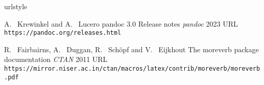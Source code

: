 \begin{thebibliography}{2}
    \providecommand{\natexlab}[1]{#1}
    \providecommand{\url}[1]{\texttt{#1}}
    \expandafter\ifx\csname urlstyle\endcsname\relax
      \providecommand{\doi}[1]{doi: #1}\else
      \providecommand{\doi}{doi: \begingroup \urlstyle{rm}\Url}\fi

A.~ Krewinkel and A.~ Lucero
\newblock pandoc 3.0 Release notes
\newblock \emph{pandoc}  2023
\newblock URL \url{https://pandoc.org/releases.html}

R.~ Fairbairns, A.~ Duggan, R.~ Schöpf and V.~ Eijkhout
\newblock The moreverb package documentation
\newblock \emph{CTAN}  2011
\newblock URL \url{https://mirror.niser.ac.in/ctan/macros/latex/contrib/moreverb/moreverb.pdf}

\end{thebibliography}


\address{%
Abhishek Ulayil\\
Institute of Actuaries of India (Student)\\%
Mumbai, India\\
ORCiD: 0009-0000-6935-8690\\
}
